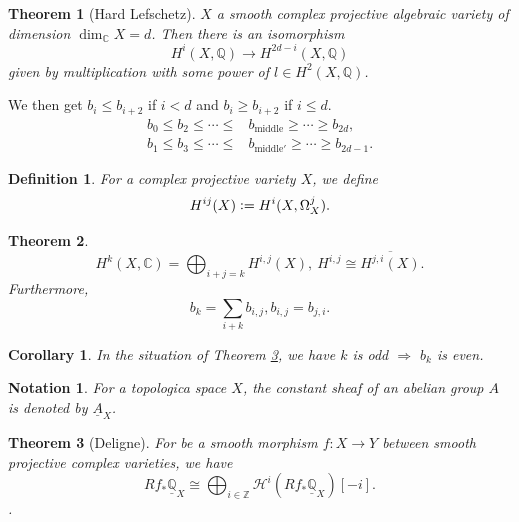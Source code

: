 \documentclass[8pt]{article}
\numberwithin{equation}{section}
\newtheorem{theorem}{Theorem} [section]
\newtheorem{definition}{Definition}[section]
\newtheorem{notation}{Notation}[section]
\newtheorem{corollary}{Corollary} [section]
\newcommand{\defeq}{\vcentcolon=}
\newcommand{\Z}[0]{\mathbb{Z}}
\newcommand{\C}[0]{\mathbb{C}}
\newcommand{\Q}[0]{\mathbb{Q}}
\begin{document}
\begin{theorem}[Hard Lefschetz]
    \label{theorem_1_2}
    $X$ a smooth complex projective algebraic variety of dimension $\dim_\C X= d$. Then there is an isomorphism 
    \begin{equation*}
    H^i(X,\Q)\to H^{2d-i}(X,\Q)
    \end{equation*}
    given by multiplication with some power of $l\in H^2(X,\Q)$.
    \begin{center}
\end{center}
\end{theorem}
We then get $b_i\leq b_{i+2}$ if $i<d$ and $b_i\geq b_{i+2}$ if $i\leq d$.
\begin{align*}
    b_0\leq b_2\leq\cdots\leq &b_{\mathrm{middle}}\geq\cdots\geq b_{2d},\\
    b_1\leq b_3\leq\cdots\leq &b_{\mathrm{middle}'}\geq\cdots\geq b_{2d-1}.
\end{align*}
\begin{definition}
    \label{definition_1_2}
    For a complex projective variety $X$, we define
    \begin{equation*}
        H^{ij}(X)\defeq H^i(X,\Omega^j_X).
    \end{equation*}
\end{definition}
\begin{theorem}
    \label{theorem_1_3}
    \begin{equation*}
        H^k(X,\C)= \bigoplus_{i+j=k} H^{i,j}(X), \: H^{i,j}\cong \overline{H^{j,i}(X)}.
    \end{equation*}
    Furthermore, 
    \begin{equation*}
        b_k = \sum_{i+k}b_{i,j}, b_{i,j} = b_{j,i}.
    \end{equation*}
\end{theorem}
\begin{corollary}
    In the situation of Theorem \ref{theorem_1_4}, we have $k$ is odd $\Rightarrow$ $b_k$ is even.
\end{corollary}
\begin{notation}
For a topologica space $X$, the constant sheaf of an abelian group $A$ is denoted by $\underline{A}_X$.
\end{notation}
\begin{theorem}[Deligne]
    For be a smooth morphism $f:X\to Y$ between smooth projective complex varieties, we have
    \begin{equation*}
        Rf_*\underline{\Q}_X \cong \bigoplus_{i\in\Z}\mathcal{H}^i(Rf_*\underline{\Q}_X)[-i].
    \end{equation*}
    \label{theorem_1_4}.
\end{theorem}
\end{document}
